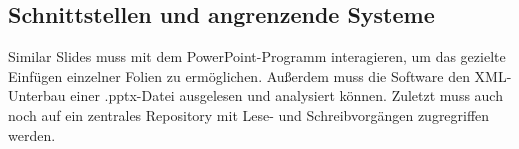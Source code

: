 \subsection{Schnittstellen und angrenzende Systeme} 
Similar Slides muss mit dem PowerPoint-Programm interagieren, um das gezielte Einfügen einzelner Folien zu ermöglichen. Außerdem muss die Software den XML-Unterbau einer .pptx-Datei ausgelesen und analysiert können. Zuletzt muss auch noch auf ein zentrales Repository mit Lese- und Schreibvorgängen zugregriffen werden. 

